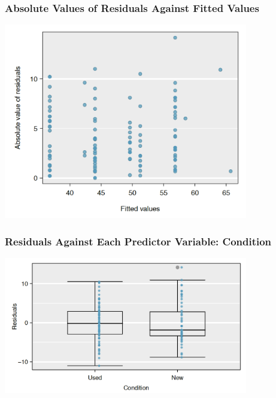 \documentclass[handout]{beamer}
\begin{document}
\begin{frame}[fragile]
\frametitle{Absolute Values of Residuals Against Fitted Values}

\begin{center}
\includegraphics[width=0.8\textwidth]{figure/abs_value.png}
\end{center}

\end{frame}


\begin{frame}[fragile]
\frametitle{Residuals Against Each Predictor Variable: Condition}

\begin{center}
\includegraphics[width=0.8\textwidth]{figure/pred1.png}
\end{center}

\end{frame}
\end{document}
